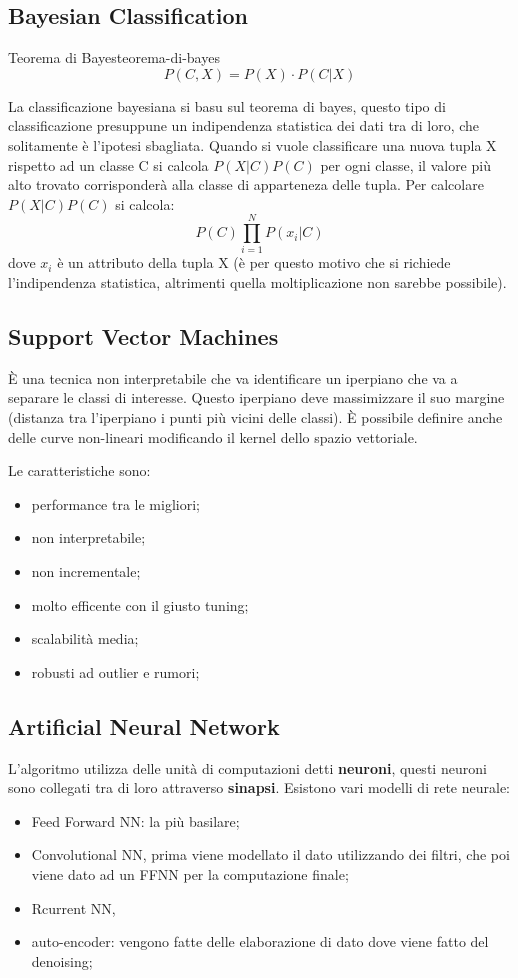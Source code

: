 \documentclass[12pt]{article}
\begin{document}
\subsection{Bayesian Classification}
\begin{theorem}{Teorema di Bayes}{teorema-di-bayes}
    \[ P(C,X) = P(X) \cdot P(C|X) \]
\end{theorem}
La classificazione bayesiana si basu sul teorema di bayes, questo tipo di classificazione presuppune un indipendenza statistica dei dati tra di loro, che solitamente \`e l'ipotesi sbagliata. Quando si vuole classificare una nuova tupla X rispetto ad un classe C si calcola $P(X|C)P(C)$ per ogni classe, il valore pi\`u alto trovato corrisponder\`a alla classe di apparteneza delle tupla. Per calcolare $P(X|C)P(C)$ si calcola:
\[ P(C) \prod_{i=1}^{N} P(x_i|C)  \]
dove $x_i$ \`e un attributo della tupla X (\`e per questo motivo che si richiede l'indipendenza statistica, altrimenti quella moltiplicazione non sarebbe possibile).


\subsection{Support Vector Machines}
\`E una tecnica non interpretabile che va identificare un iperpiano che va a separare le classi di interesse. Questo iperpiano deve massimizzare il suo margine (distanza tra l'iperpiano i punti pi\`u vicini delle classi). \`E possibile definire anche delle curve non-lineari modificando il kernel dello spazio vettoriale.

Le caratteristiche sono:
\begin{itemize}
    \item performance tra le migliori;
    \item non interpretabile;
    \item non incrementale;
    \item molto efficente con il giusto tuning;
    \item scalabilit\`a media;
    \item robusti ad outlier e rumori;
\end{itemize}


\subsection{Artificial Neural Network}
L'algoritmo utilizza delle unit\`a di computazioni detti \textbf{neuroni}, questi neuroni sono collegati tra di loro attraverso \textbf{sinapsi}. Esistono vari modelli di rete neurale:
\begin{itemize}
    \item Feed Forward NN: la pi\`u basilare;
    \item Convolutional NN, prima viene modellato il dato utilizzando dei filtri, che poi viene dato ad un FFNN per la computazione finale;
    \item Rcurrent NN, 
    \item auto-encoder: vengono fatte delle elaborazione di dato dove viene fatto del denoising;
\end{itemize}
\end{document}

